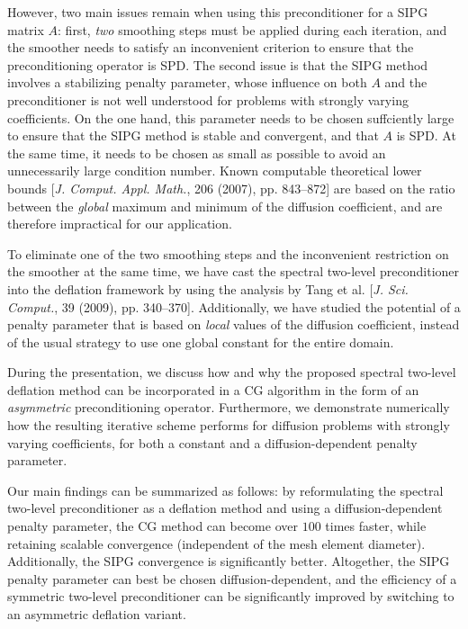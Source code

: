\documentclass{report}
\begin{document}
However, two main issues remain when using this preconditioner for a SIPG matrix $A$:
first, \emph{two} smoothing steps must be applied during each iteration,
and the smoother needs to satisfy an inconvenient criterion to ensure
that the preconditioning operator is SPD. The second issue is that the
SIPG method involves a stabilizing penalty parameter, whose influence on
both $A$ and the preconditioner is not well understood for problems with
strongly varying coefficients. On the one hand, this parameter needs to
be chosen suffciently large to ensure that the SIPG method is stable and
convergent, and that $A$ is SPD. At the same time, it needs to be chosen
as small as possible to avoid an unnecessarily large condition number.
Known computable theoretical lower bounds [\textit{J. Comput. Appl.
Math.}, 206 (2007), pp. 843--872] are based on the ratio between the
\emph{global} maximum and minimum of the diffusion coefficient, and are
therefore impractical for our application.

To eliminate one of the two smoothing steps and the inconvenient
restriction on the smoother at the same time, we have cast the spectral
two-level preconditioner into the deflation framework by using the
analysis by Tang et al. [\textit{J. Sci. Comput.}, 39 (2009), pp.
340--370]. Additionally, we have studied the potential of a penalty
parameter that is based on \emph{local} values of the diffusion
coefficient, instead of the usual strategy to use one global constant for
the entire domain.

During the presentation, we discuss how and why the proposed spectral
two-level deflation method can be incorporated in a CG algorithm in the
form of an \emph{asymmetric} preconditioning operator. Furthermore, we
demonstrate numerically how the resulting iterative scheme performs for
diffusion problems with strongly varying coefficients, for both a
constant and a diffusion-dependent penalty parameter.

Our main findings can be summarized as follows: by reformulating the
spectral two-level preconditioner as a deflation method and using a
diffusion-dependent penalty parameter, the CG method can become over
$100$ times faster, while retaining scalable convergence (independent of
the mesh element diameter). Additionally, the SIPG convergence is
significantly better.
Altogether, the SIPG penalty parameter can best be chosen
diffusion-dependent, and the efficiency of a symmetric two-level
preconditioner can be significantly improved by switching to an
asymmetric deflation variant.
\end{document}
